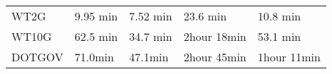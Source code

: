 \begin{longtable}[]{@{}lllll@{}}
\begin{minipage}[t]{0.17\columnwidth}\raggedright\strut
WT2G
\strut\end{minipage} &
\begin{minipage}[t]{0.17\columnwidth}\raggedright\strut
9.95 min
\strut\end{minipage} &
\begin{minipage}[t]{0.17\columnwidth}\raggedright\strut
7.52 min
\strut\end{minipage} &
\begin{minipage}[t]{0.17\columnwidth}\raggedright\strut
23.6 min
\strut\end{minipage} &
\begin{minipage}[t]{0.17\columnwidth}\raggedright\strut
10.8 min
\strut\end{minipage}\tabularnewline
\begin{minipage}[t]{0.17\columnwidth}\raggedright\strut
WT10G
\strut\end{minipage} &
\begin{minipage}[t]{0.17\columnwidth}\raggedright\strut
62.5 min
\strut\end{minipage} &
\begin{minipage}[t]{0.17\columnwidth}\raggedright\strut
34.7 min
\strut\end{minipage} &
\begin{minipage}[t]{0.17\columnwidth}\raggedright\strut
2hour 18min
\strut\end{minipage} &
\begin{minipage}[t]{0.17\columnwidth}\raggedright\strut
53.1 min
\strut\end{minipage}\tabularnewline
\begin{minipage}[t]{0.17\columnwidth}\raggedright\strut
DOTGOV
\strut\end{minipage} &
\begin{minipage}[t]{0.17\columnwidth}\raggedright\strut
71.0min
\strut\end{minipage} &
\begin{minipage}[t]{0.17\columnwidth}\raggedright\strut
47.1min
\strut\end{minipage} &
\begin{minipage}[t]{0.17\columnwidth}\raggedright\strut
2hour 45min
\strut\end{minipage} &
\begin{minipage}[t]{0.17\columnwidth}\raggedright\strut
1hour 11min
\strut\end{minipage}\tabularnewline
\bottomrule
\end{longtable}


